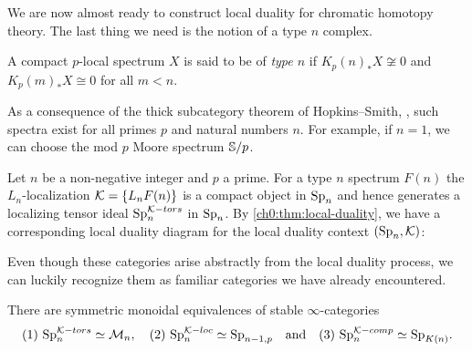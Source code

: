 We are now almost ready to construct local duality for chromatic homotopy theory. The last thing we need is the notion of a type $n$ complex. 

\begin{definition}
    \label{ch0:def:type-n-spectrum}
    A compact $p$-local spectrum $X$ is said to be of \emph{type $n$} if $K_p(n)_* X\not\cong 0$ and $K_p(m)_*X\cong 0$ for all $m<n$. 
\end{definition}

As a consequence of the thick subcategory theorem of Hopkins--Smith, \cite[Theorem 7]{hopkins-smith_1998}, such spectra exist for all primes $p$ and natural numbers $n$. For example, if $n=1$, we can choose the mod $p$ Moore spectrum $\S/p$.  

\begin{construction}
    \label{ch0:const:chromatic-duality}
    Let $n$ be a non-negative integer and $p$ a prime. For a type $n$ spectrum $F(n)$ the $L_n$-localization $\K=\{L_nF(n)\}$ is a compact object in $\Sp\np$ and hence generates a localizing tensor ideal $\Sp\np^{\K-tors}$ in $\Sp\np$. By \cref{ch0:thm:local-duality}, we have a corresponding local duality diagram for the local duality context $(\Sp\np, \K)$:
    \begin{center}
    \end{center}
\end{construction}

Even though these categories arise abstractly from the local duality process, we can luckily recognize them as familiar categories we have already encountered.

\begin{proposition}
    \label{ch0:prop:torsion-is-monochromatic}
    There are symmetric monoidal equivalences of stable $\infty$-categories 
    \[(1)~\Sp\np^{\K-tors}\simeq \M\np, \quad (2)~\sp\np^{\K-loc}\simeq \Sp_{n-1,p} \quad \text{and}\quad (3)~\Sp\np^{\K-comp}\simeq \SpKn.\]
\end{proposition}

